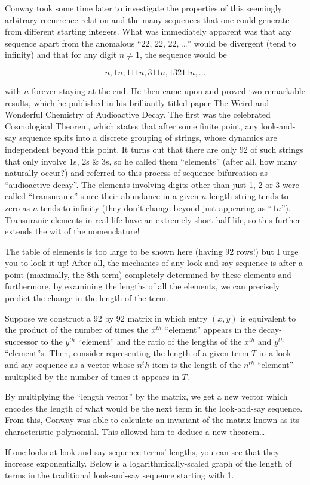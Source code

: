 \documentclass[11pt,a4paper]{report}
\begin{document}
\begin{multicols}{2}
		Conway took some time later to investigate the properties of this seemingly arbitrary recurrence relation and the many sequences that one could generate from different starting integers. What was immediately apparent was that any sequence apart from the anomalous “22, 22, 22, \ldots” would be divergent (tend to infinity) and that for any digit \(n \neq 1\), the sequence would be
		
		\[n, 1n, 111n, 311n, 13211n, \ldots\]
		
		with \(n\) forever staying at the end. He then came upon and proved two remarkable results, which he published in his brilliantly titled paper The Weird and Wonderful Chemistry of Audioactive Decay. The first was the celebrated Cosmological Theorem, which states that after some finite point, any look-and-say sequence splits into a discrete grouping of strings, whose dynamics are independent beyond this point. It turns out that there are only 92 of such strings that only involve 1s, 2s \& 3s, so he called them “elements” (after all, how many naturally occur?) and referred to this process of sequence bifurcation as “audioactive decay”. The elements involving digits other than just 1, 2 or 3 were called “transuranic” since their abundance in a given \(n\)-length string tends to zero as \(n\) tends to infinity (they don’t change beyond just appearing as “\(1n\)”). Transuranic elements in real life have an extremely short half-life, so this further extends the wit of the nomenclature!\par
		The table of elements is too large to be shown here (having 92 rows!) but I urge you to look it up! After all, the mechanics of any look-and-say sequence is after a point (maximally, the 8th term) completely determined by these elements and furthermore, by examining the lengths of all the elements, we can precisely predict the change in the length of the term.\par
		Suppose we construct a 92 by 92 matrix in which entry \((x, y)\) is equivalent to the product of the number of times the \(x^{th}\) “element” appears in the decay-successor to the \(y^{th}\) “element” and the ratio of the lengths of the \(x^{th}\) and \(y^{th}\) “element”s. Then, consider representing the length of a given term \(T\) in a look-and-say sequence as a vector whose \(n^th\) item is the length of the \(n^{th}\) “element” multiplied by the number of times it appears in \(T\).\par
		By multiplying the “length vector” by the matrix, we get a new vector which encodes the length of what would be the next term in the look-and-say sequence. From this, Conway was able to calculate an invariant of the matrix known as its characteristic polynomial. This allowed him to deduce a new theorem…\par
		If one looks at look-and-say sequence terms’ lengths, you can see that they increase exponentially. Below is a logarithmically-scaled graph of the length of terms in the traditional look-and-say sequence starting with 1.\par
		
	\end{multicols}
	
\end{document}
